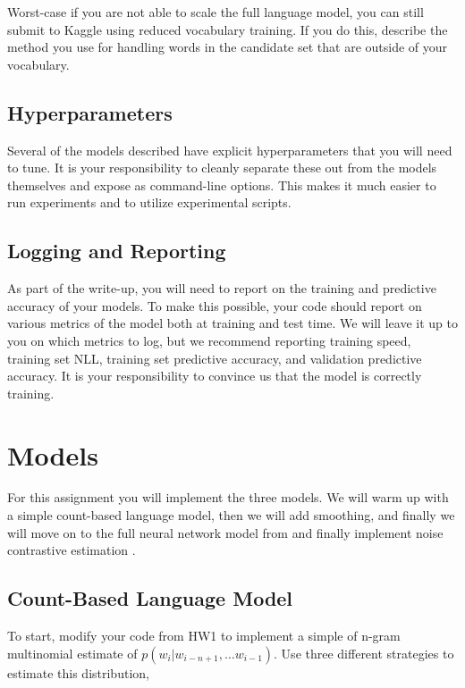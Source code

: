 \documentclass[11pt]{article}
\begin{document}
Worst-case if you are not able to scale the full language model, you
can still submit to Kaggle using reduced vocabulary training. If you do this, 
describe the method you use for handling words in the candidate set that are 
outside of your vocabulary.


\subsection{Hyperparameters}

Several of the models described have explicit hyperparameters that you will 
need to tune. It is your responsibility to cleanly separate these out from 
the models themselves and expose as command-line options. This makes it much 
easier to run experiments and to utilize experimental scripts. 

\subsection{Logging and Reporting}

As part of the write-up, you will need to report on the training and
predictive accuracy of your models. To make this possible, your code
should report on various metrics of the model both at training and
test time. We will leave it up to you on which metrics to log, but we
recommend reporting training speed, training set NLL, training set
predictive accuracy, and validation predictive accuracy. It is your
responsibility to convince us that the model is correctly training.

\section{Models}

For this assignment you will implement the three models. We will warm
up with a simple count-based language model, then we will add
smoothing, and finally we will move on to the full neural network
model from \citet{DBLP:journals/jmlr/BengioDVJ03} and finally implement noise contrastive estimation \citep{gutmann2010noise}.

\subsection{Count-Based Language Model}

To start, modify your code from HW1 to implement a simple of
n-gram multinomial estimate of $p(w_i | w_{i-n+1}, \ldots w_{i-1})$. 
Use three different strategies to estimate this distribution,
\end{document}
